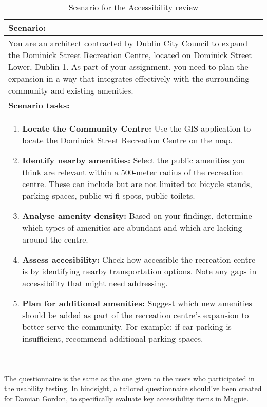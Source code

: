 \begin{table}[h!]
    \centering
    \caption{Scenario for the Accessibility review}
    \begin{tabular}{|p{\textwidth}|}
        \hline
        \textbf{Scenario:}                                                                                                                                                                                                                                                                                         \\
        \hline
        You are an architect contracted by Dublin City Council to expand the Dominick Street Recreation Centre, located on Dominick Street Lower, Dublin 1. As part of your assignment, you need to plan the expansion in a way that integrates effectively with the surrounding community and existing amenities. \\
        \hline
        \textbf{Scenario tasks:}                                                                                                                                                                                                                                                                                   \\
        \hline
        \begin{enumerate}
            \item \textbf{Locate the Community Centre:} Use the GIS application to locate the Dominick Street Recreation Centre on the map.
            \item \textbf{Identify nearby amenities:} Select the public amenities you think are relevant within a 500-meter radius of the recreation centre. These can include but are not limited to: bicycle stands, parking spaces, public wi-fi spots, public toilets.
            \item \textbf{Analyse amenity density:} Based on your findings, determine which types of amenities are abundant and which are lacking around the centre.
            \item \textbf{Assess accesibility:} Check how accessible the recreation centre is by identifying nearby transportation options. Note any gaps in accessibility that might need addressing.
            \item \textbf{Plan for additional amenities:} Suggest which new amenities should be added as part of the recreation centre's expansion to better serve the community. For example: if car parking is insufficient, recommend additional parking spaces.
        \end{enumerate}                                              \\
        \hline
    \end{tabular}
\end{table}
\\
The questionnaire is the same as the one given to the users who participated in the usability testing. In hindsight, a tailored questionnaire should've been created for Damian Gordon, to specifically evaluate key accessibility items in Magpie.
\\\\

